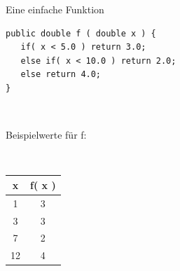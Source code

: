 \begin{frame}[t,fragile]{Eine einfache Funktion} %
\begin{lstlisting}
public double f ( double x ) {
   if( x < 5.0 ) return 3.0;
   else if( x < 10.0 ) return 2.0;
   else return 4.0;
}
\end{lstlisting}
~ \\[-.5em]
\begin{minipage}[t]{3.5cm}
Beispielwerte für f:

~ \\
\begin{tabular}{|c|c|}
\textbf{x} & \textbf{f( x )}  \\ \hline
1 & 3  \\
3 & 3  \\
7 & 2  \\
12 & 4
\end{tabular} 
\end{minipage} 
\hfill
\begin{minipage}[t]{5.5cm}
~ \\
\vspace{-2em}\\

\end{minipage}
\end{frame}
